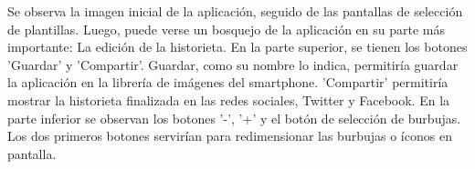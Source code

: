 \documentclass[12pt]{report}
\begin{document}
\begingroup
			\vspace{3mm}
		\endgroup
Se observa la imagen inicial de la aplicación, seguido de las pantallas de selección de plantillas. Luego, puede verse un bosquejo de la aplicación en su parte más importante: La edición de la historieta.
 \newline
 \newline
En la parte superior, se tienen los botones 'Guardar' y 'Compartir'. Guardar, como su nombre lo indica, permitiría guardar la aplicación en la librería de imágenes del smartphone. 'Compartir' permitiría mostrar la historieta finalizada en las redes sociales, Twitter y Facebook.
 \newline
 \newline
En la parte inferior se observan los botones '-', '+'  y el botón de selección de burbujas. Los dos primeros botones servirían para redimensionar las burbujas o íconos en pantalla.
           \newline
           \newline
\end{document}
